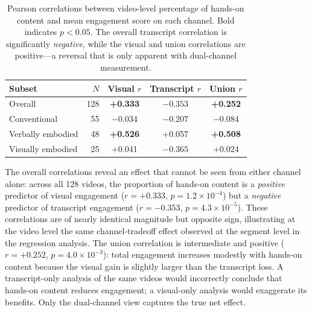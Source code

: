 \documentclass[fleqn,10pt]{wlscirep}
\begin{document}
\begin{table}[ht]
    \centering
    \caption{Pearson correlations between video-level percentage of hands-on content and mean engagement score on each channel. Bold indicates $p < 0.05$. The overall transcript correlation is significantly \emph{negative}, while the visual and union correlations are positive---a reversal that is only apparent with dual-channel measurement.}
    \label{tab:video_corr}
    \begin{tabular}{lrccc}
        \toprule
        Subset & $N$ & Visual $r$ & Transcript $r$ & Union $r$ \\
        \midrule
        Overall & 128 & \textbf{+0.333} & \textbf{$-0.353$} & \textbf{+0.252} \\
        Conventional & 55 & $-0.034$ & $-0.207$ & $-0.084$ \\
        Verbally embodied & 48 & \textbf{+0.526} & +0.057 & \textbf{+0.508} \\
        Visually embodied & 25 & +0.041 & $-0.365$ & +0.024 \\
        \bottomrule
    \end{tabular}
\end{table}

The overall correlations reveal an effect that cannot be seen from either channel alone: across all 128 videos, the proportion of hands-on content is a \emph{positive} predictor of visual engagement ($r = +0.333$, $p = 1.2 \times 10^{-4}$) but a \emph{negative} predictor of transcript engagement ($r = -0.353$, $p = 4.3 \times 10^{-5}$). These correlations are of nearly identical magnitude but opposite sign, illustrating at the video level the same channel-tradeoff effect observed at the segment level in the regression analysis. The union correlation is intermediate and positive ($r = +0.252$, $p = 4.0 \times 10^{-3}$): total engagement increases modestly with hands-on content because the visual gain is slightly larger than the transcript loss. A transcript-only analysis of the same videos would incorrectly conclude that hands-on content reduces engagement; a visual-only analysis would exaggerate its benefits. Only the dual-channel view captures the true net effect.
\end{document}
